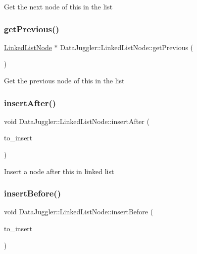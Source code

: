 Get the next node of this in the list \mbox{\label{classDataJuggler_1_1LinkedListNode_a12df61829bc55f904a6c7e3c71ab0cdd}} 
\subsubsection{\texorpdfstring{get\+Previous()}{getPrevious()}}
{\footnotesize\ttfamily \hyperlink{classDataJuggler_1_1LinkedListNode}{Linked\+List\+Node} $\ast$ Data\+Juggler\+::\+Linked\+List\+Node\+::get\+Previous (\begin{DoxyParamCaption}{ }\end{DoxyParamCaption})}

Get the previous node of this in the list \mbox{\label{classDataJuggler_1_1LinkedListNode_a509b4493bb13fc771481da50f7593bd9}} 
\subsubsection{\texorpdfstring{insert\+After()}{insertAfter()}}
{\footnotesize\ttfamily void Data\+Juggler\+::\+Linked\+List\+Node\+::insert\+After (\begin{DoxyParamCaption}\item[{\hyperlink{classDataJuggler_1_1LinkedListNode}{Linked\+List\+Node} $\ast$}]{to\+\_\+insert }\end{DoxyParamCaption})}

Insert a node after this in linked list \mbox{\label{classDataJuggler_1_1LinkedListNode_a50f738d5f3c69e78f417ab5172924a8c}} 
\subsubsection{\texorpdfstring{insert\+Before()}{insertBefore()}}
{\footnotesize\ttfamily void Data\+Juggler\+::\+Linked\+List\+Node\+::insert\+Before (\begin{DoxyParamCaption}\item[{\hyperlink{classDataJuggler_1_1LinkedListNode}{Linked\+List\+Node} $\ast$}]{to\+\_\+insert }\end{DoxyParamCaption})}

